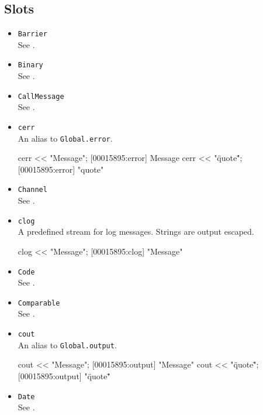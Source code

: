 \subsection{Slots}
\begin{itemize}
\item \lstinline|Barrier|\\
  See .

\item \lstinline|Binary|\\
  See .

\item \lstinline|CallMessage|\\
  See .

\item \lstinline|cerr|\\
  An alias to \lstinline|Global.error|.
\begin{urbiscript}[firstnumber=last]
cerr << "Message";
[00015895:error] Message
cerr << "\"quote\"";
[00015895:error] "quote"
\end{urbiscript}

\item \lstinline|Channel|\\
  See .

\item \lstinline|clog|\\
  A predefined stream for log messages.  Strings are output escaped.
\begin{urbiscript}[firstnumber=last]
clog << "Message";
[00015895:clog] "Message"
\end{urbiscript}

\item \lstinline|Code|\\
  See .

\item \lstinline|Comparable|\\
  See .

\item \lstinline|cout|\\
  An alias to \lstinline|Global.output|.
\begin{urbiscript}[firstnumber=last]
cout << "Message";
[00015895:output] "Message"
cout << "\"quote\"";
[00015895:output] "\"quote\""
\end{urbiscript}

\item \lstinline|Date|\\
  See .


\end{itemize}
